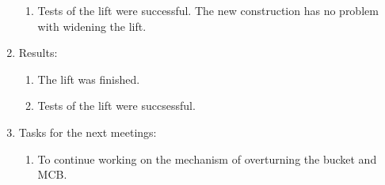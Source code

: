 \begin{enumerate}
\begin{enumerate}
      \item Tests of the lift were successful. The new construction has no problem with widening the lift.
      
    \end{enumerate}
    
	\item Results:  
	\begin{enumerate}
	  \item The lift was finished.
	  
	  \item Tests of the lift were succsessful.
	  
    \end{enumerate}
    
	\item Tasks for the next meetings:
	\begin{enumerate}
	  \item To continue working on the mechanism of overturning the bucket and MCB.
	  
    \end{enumerate}     
\end{enumerate}
\fillpage

